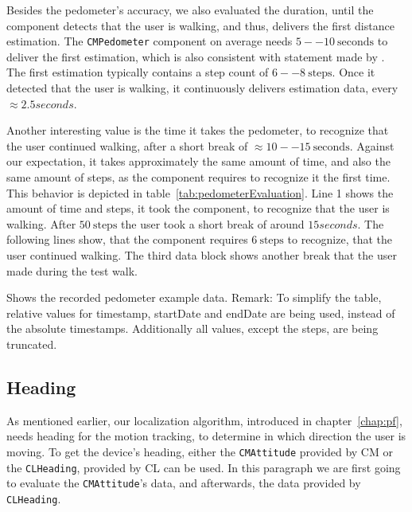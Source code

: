 Besides the pedometer's accuracy, we also evaluated the duration, until the component detects that the user is walking, and thus, delivers the first distance estimation. The \texttt{CMPedometer} component on average needs $5--10~\text{seconds}$ to deliver the first estimation, which is also consistent with statement made by \citet{apple:wwdc_2014_pham}. The first estimation typically contains a step count of $6--8~\text{steps}$. Once it detected that the user is walking, it continuously delivers estimation data, every $\approx 2.5 seconds$.

Another interesting value is the time it takes the pedometer, to recognize that the user continued walking, after a short break of $\approx 10--15~\text{seconds}$. Against our expectation, it takes approximately the same amount of time, and also the same amount of steps, as the component requires to recognize it the first time. This behavior is depicted in table~\ref{tab:pedometerEvaluation}. Line 1 shows the amount of time and steps, it took the component, to recognize that the user is walking. After $50~\text{steps}$ the user took a short break of around $15 seconds$. The following lines show, that the component requires $6~\text{steps}$ to recognize, that the user continued walking. The third data block shows another break that the user made during the test walk.

\begin{table}
	
	\caption{Shows the recorded pedometer example data. Remark: To simplify the table, relative values for timestamp, startDate and endDate are being used, instead of the absolute timestamps. Additionally all values, except the steps, are being truncated.}
	\label{tab:pedometerEvaluation}
\end{table}


\subsection{Heading}
As mentioned earlier, our localization algorithm, introduced in chapter~\ref{chap:pf}, needs heading for the motion tracking, to determine in which direction the user is moving. To get the device's heading, either the \texttt{CMAttitude} provided by \ac{CM} or the \texttt{CLHeading}, provided by \ac{CL} can be used. In this paragraph we are first going to evaluate the \texttt{CMAttitude}'s data, and afterwards, the data provided by \texttt{CLHeading}.

